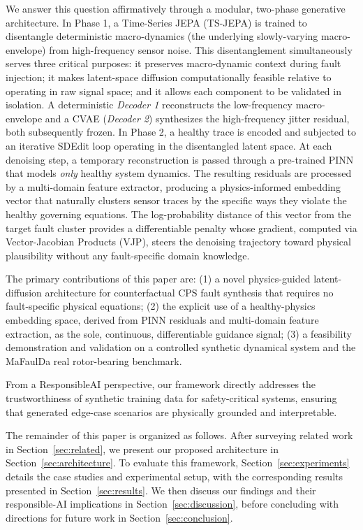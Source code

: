 \documentclass[conference]{IEEEtran}
\begin{document}
We answer this question affirmatively through a modular, two-phase generative architecture. In Phase 1, a Time-Series JEPA (TS-JEPA) \cite{jepa2024} is trained to disentangle deterministic macro-dynamics (the underlying slowly-varying macro-envelope) from high-frequency sensor noise. This disentanglement simultaneously serves three critical purposes: it preserves macro-dynamic context during fault injection; it makes latent-space diffusion computationally feasible relative to operating in raw signal space; and it allows each component to be validated in isolation. A deterministic \textit{Decoder 1} reconstructs the low-frequency macro-envelope and a CVAE (\textit{Decoder 2}) synthesizes the high-frequency jitter residual, both subsequently frozen. In Phase 2, a healthy trace is encoded and subjected to an iterative SDEdit \cite{sdedit2021} loop operating in the disentangled latent space. At each denoising step, a temporary reconstruction is passed through a pre-trained PINN \cite{spotorno2026linking} that models \emph{only} healthy system dynamics. The resulting residuals are processed by a multi-domain feature extractor, producing a physics-informed embedding vector that naturally clusters sensor traces by the specific ways they violate the healthy governing equations. The log-probability distance of this vector from the target fault cluster provides a differentiable penalty whose gradient, computed via Vector-Jacobian Products (VJP), steers the denoising trajectory toward physical plausibility without any fault-specific domain knowledge.

The primary contributions of this paper are: (1) a novel physics-guided latent-diffusion architecture for counterfactual CPS fault synthesis that requires no fault-specific physical equations; (2) the explicit use of a healthy-physics embedding space, derived from PINN residuals and multi-domain feature extraction, as the sole, continuous, differentiable guidance signal; (3) a feasibility demonstration and validation on a controlled synthetic dynamical system and the MaFaulDa real rotor-bearing benchmark.

From a ResponsibleAI perspective, our framework directly addresses the trustworthiness of synthetic training data for safety-critical systems, ensuring that generated edge-case scenarios are physically grounded and interpretable.

The remainder of this paper is organized as follows. After surveying related work in Section~\ref{sec:related}, we present our proposed architecture in Section~\ref{sec:architecture}. To evaluate this framework, Section~\ref{sec:experiments} details the case studies and experimental setup, with the corresponding results presented in Section~\ref{sec:results}. We then discuss our findings and their responsible-AI implications in Section~\ref{sec:discussion}, before concluding with directions for future work in Section~\ref{sec:conclusion}.
\end{document}
